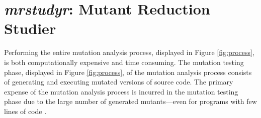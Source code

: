 

\section{\textit{mrstudyr}: Mutant Reduction Studier}

Performing the entire mutation analysis process, displayed in Figure \ref{fig:process},
is both computationally expensive and time consuming. The mutation testing
phase, displayed in Figure \ref{fig:process}, of the mutation analysis
process consists of generating and executing mutated versions of source code. The primary
expense of the mutation analysis process is incurred in the mutation testing phase
due to the large number of generated mutants---even for programs with few lines of code \cite{offutt2001mutation}.







